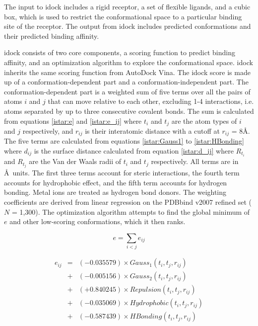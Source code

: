 The input to idock includes a rigid receptor, a set of flexible ligands, and a cubic box, which is used to restrict the conformational space to a particular binding site of the receptor. The output from idock includes predicted conformations and their predicted binding affinity.

idock consists of two core components, a scoring function to predict binding affinity, and an optimization algorithm to explore the conformational space. idock inherits the same scoring function from AutoDock Vina. The idock score is made up of a conformation-dependent part and a conformation-independent part. The conformation-dependent part is a weighted sum of five terms over all the pairs of atoms $i$ and $j$ that can move relative to each other, excluding 1-4 interactions, i.e. atoms separated by up to three consecutive covalent bonds. The sum is calculated from equations \eqref{istar:e} and \eqref{istar:e_ij} where $t_i$ and $t_j$ are the atom types of $i$ and $j$ respectively, and $r_{ij}$ is their interatomic distance with a cutoff at $r_{ij}$ = 8\AA. The five terms are calculated from equations \eqref{istar:Gauss1} to \eqref{istar:HBonding} where $d_{ij}$ is the surface distance calculated from equation \eqref{istar:d_ij} where $R_{t_i}$ and $R_{t_j}$ are the Van der Waals radii of $t_i$ and $t_j$ respectively. All terms are in \AA\ units. The first three terms account for steric interactions, the fourth term accounts for hydrophobic effect, and the fifth term accounts for hydrogen bonding. Metal ions are treated as hydrogen bond donors. The weighting coefficients are derived from linear regression on the PDBbind \citep{529,530} v2007 refined set ($N$ = 1,300). The optimization algorithm attempts to find the global minimum of $e$ and other low-scoring conformations, which it then ranks.

\begin{equation}
\label{istar:e}
e = \sum_{i < j} e_{ij}
\end{equation}

\begin{eqnarray}
\label{istar:e_ij}
e_{ij} &=& (-0.035579) \times Gauss_1(t_i, t_j, r_{ij}) \nonumber \\
       &+& (-0.005156) \times Gauss_2(t_i, t_j, r_{ij}) \nonumber \\
       &+& (+0.840245) \times Repulsion(t_i, t_j, r_{ij}) \nonumber \\
       &+& (-0.035069) \times Hydrophobic(t_i, t_j, r_{ij}) \nonumber \\
       &+& (-0.587439) \times HBonding(t_i, t_j, r_{ij})
\end{eqnarray}

